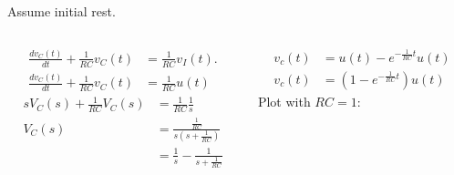 \begin{frame}
    Assume initial rest.
    \begin{columns}[T,totalwidth=\textwidth]
        \begin{column}{0.5\textwidth}
            \begin{align*}
                \frac{dv_C(t)}{dt} + \frac{1}{RC}v_C(t) &= \frac{1}{RC}v_I(t).\\
                \frac{dv_C(t)}{dt} + \frac{1}{RC}v_C(t) &= \frac{1}{RC}u(t)
            \end{align*}
            \begin{align*}
                sV_C(s) + \frac{1}{RC}V_C(s) &= \frac{1}{RC}\frac{1}{s}\\
                V_C(s) &= \frac{\frac{1}{RC}}{s(s+ \frac{1}{RC})}\\
                &= \frac{1}{s}  - \frac{1}{s+ \frac{1}{RC}}
            \end{align*}
        \end{column}
        \begin{column}{0.5\textwidth}
            \begin{align*}
                v_c(t) &= u(t) - e^{-\frac{1}{RC}t}u(t)\\
                v_c(t) &= \left(1 - e^{-\frac{1}{RC}t}\right)u(t)
            \end{align*}
            Plot with $RC=1$:
            \begin{center}
                
            \end{center}
        \end{column}
    \end{columns}
\end{frame}



